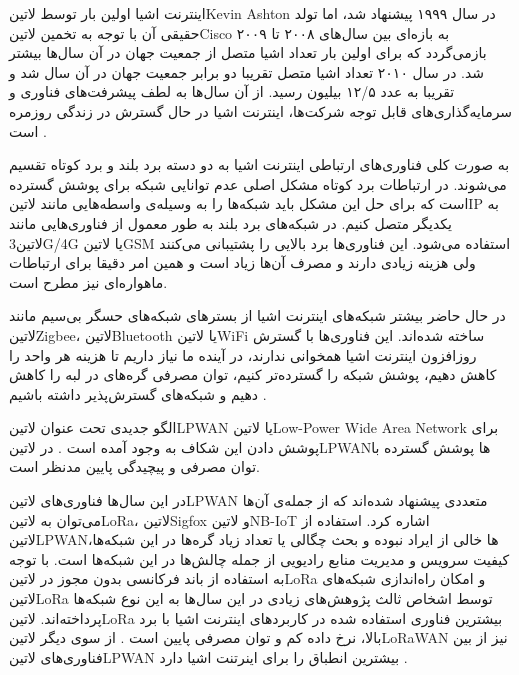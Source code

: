 
اینترنت اشیا اولین بار توسط ‌لاتین{Kevin Ashton} در سال ۱۹۹۹ پیشنهاد شد، اما تولد حقیقی آن
با توجه به تخمین ‌لاتین{Cisco} به بازه‌ای بین سال‌های ۲۰۰۸ تا ۲۰۰۹ بازمی‌گردد که برای اولین بار تعداد اشیا
متصل از جمعیت جهان در آن سال‌ها بیشتر شد. در سال ۲۰۱۰ تعداد اشیا متصل تقریبا دو برابر جمعیت جهان در آن سال شد و تقریبا به عدد ۱۲/۵ بیلیون رسید.
از آن سال‌ها به لطف پیشرفت‌های فناوری و سرمایه‌گذاری‌های قابل توجه شرکت‌ها، اینترنت اشیا در حال گسترش در زندگی روزمره است
.

به صورت کلی فناوری‌های ارتباطی اینترنت اشیا به دو دسته برد بلند و برد کوتاه تقسیم می‌شوند. در ارتباطات برد کوتاه مشکل اصلی عدم توانایی شبکه برای پوشش گسترده است
که برای حل این مشکل باید شبکه‌ها را به وسیله‌ی واسطه‌هایی مانند ‌لاتین{IP} به یکدیگر متصل کنیم.
در شبکه‌های برد بلند به طور معمول از فناوری‌هایی مانند ‌لاتین{3G/4G} یا ‌لاتین{GSM} استفاده می‌شود.
این فناوری‌ها برد بالایی را پشتیبانی می‌کنند ولی هزینه زیادی دارند و مصرف آن‌ها زیاد است و همین امر دقیقا برای ارتباطات ماهواره‌ای نیز مطرح است.

در حال حاضر بیشتر شبکه‌های اینترنت اشیا از بسترهای شبکه‌های حسگر بی‌سیم مانند ‌لاتین{Zigbee}، ‌لاتین{Bluetooth} یا ‌لاتین{WiFi} ساخته شده‌اند.
این فناوری‌ها با گسترش روزافزون اینترنت اشیا همخوانی ندارند، در آینده ما نیاز داریم تا هزینه هر واحد را کاهش دهیم،
پوشش شبکه را گسترده‌تر کنیم، توان مصرفی گره‌های در لبه را کاهش دهیم و شبکه‌های گسترش‌پذیر داشته باشیم .

الگو جدیدی تحت عنوان ‌لاتین{LPWAN} یا ‌لاتین{Low-Power Wide Area Network} برای پوشش دادن این شکاف به وجود آمده است .
در ‌لاتین{LPWAN}ها پوشش گسترده با توان مصرفی و پیچیدگی پایین مدنظر است.

در این سال‌ها فناوری‌های ‌لاتین{LPWAN} متعددی پیشنهاد شده‌اند که از جمله‌ی آن‌ها می‌توان به ‌لاتین{LoRa}، ‌لاتین{Sigfox} و ‌لاتین{NB-IoT} اشاره کرد.
استفاده از ‌لاتین{LPWAN}ها خالی از ایراد نبوده و بحث چگالی یا تعداد زیاد گره‌ها در این شبکه‌ها، کیفیت سرویس و مدیریت منابع رادیویی
از جمله چالش‌ها در این شبکه‌ها است.
با توجه به استفاده از باند فرکانسی بدون مجوز در ‌لاتین{LoRa} و امکان راه‌اندازی شبکه‌های ‌لاتین{LoRa} توسط اشخاص ثالث پژوهش‌های زیادی در این سال‌ها به این نوع شبکه‌ها پرداخته‌اند.
‌لاتین{LoRa} بیشترین فناوری استفاده شده در کاربردهای اینترنت اشیا با برد بالا، نرخ داده کم و توان مصرفی پایین است .
از سوی دیگر ‌لاتین{LoRaWAN} نیز از بین فناوری‌های ‌لاتین{LPWAN} بیشترین انطباق را برای اینرتنت اشیا دارد .

